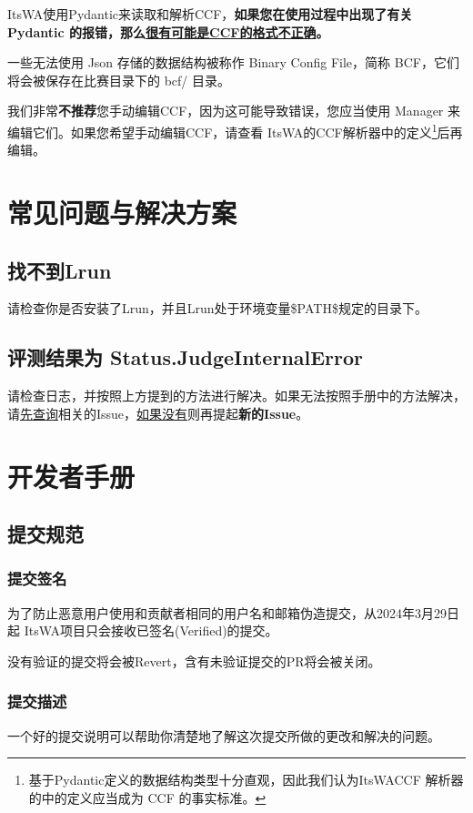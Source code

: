 \documentclass[UTF8]{ctexart}
\newcommand{\itswa}{ItsWA}
\begin{document}
        \itswa 使用Pydantic来读取和解析CCF，\textbf{如果您在使用过程中出现了有关 Pydantic 的报错，那么\uline{很有可能是CCF的格式不正确}。}
        
        一些无法使用 Json 存储的数据结构被称作 Binary Config File，简称 BCF，它们将会被保存在比赛目录下的 bcf/ 目录。

        我们非常\textbf{不推荐}您手动编辑CCF，因为这可能导致错误，您应当使用 Manager 来编辑它们。如果您希望手动编辑CCF，请查看 \itswa 的CCF解析器中的定义\footnote{基于Pydantic定义的数据结构类型十分直观，因此我们认为\itswa CCF 解析器的中的定义应当成为 CCF 的事实标准。}后再编辑。

    \section{常见问题与解决方案}
        \subsection{找不到Lrun}
            请检查你是否安装了Lrun，并且Lrun处于环境变量\$PATH\$规定的目录下。

        \subsection{评测结果为 Status.JudgeInternalError}
            请检查日志，并按照上方提到的方法进行解决。如果无法按照手册中的方法解决，请\uline{先查询}相关的Issue，\uline{如果没有}则再提起\textbf{新的Issue}。

    \section{开发者手册}
        \subsection{提交规范}
            \subsubsection{提交签名}
                为了防止恶意用户使用和贡献者相同的用户名和邮箱伪造提交，从2024年3月29日起 \itswa 项目只会接收已签名(Verified)的提交。

                没有验证的提交将会被Revert，含有未验证提交的PR将会被关闭。

            \subsubsection{提交描述}
                一个好的提交说明可以帮助你清楚地了解这次提交所做的更改和解决的问题。
                
\end{document}
